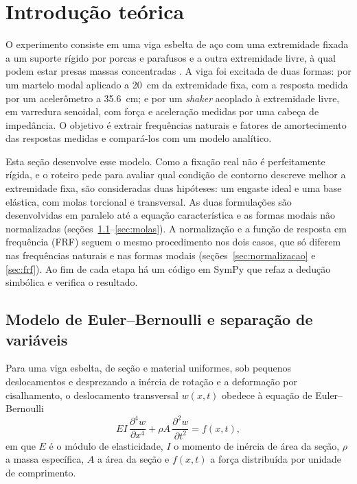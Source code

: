 \section{Introdução teórica}
\label{sec:intro}

O experimento consiste em uma viga esbelta de aço com uma extremidade fixada a um
suporte rígido por porcas e parafusos e a outra extremidade livre, à qual podem estar
presas massas concentradas \cite{roteiroLab1}. A viga foi excitada de duas formas:
por um martelo modal aplicado a \SI{20}{\centi\meter} da extremidade fixa, com a
resposta medida por um acelerômetro a \SI{35.6}{\centi\meter}; e por um
\emph{shaker} acoplado à extremidade livre, em varredura senoidal, com força e
aceleração medidas por uma cabeça de impedância. O objetivo é extrair frequências
naturais e fatores de amortecimento das respostas medidas e compará-los com um modelo
analítico.

Esta seção desenvolve esse modelo. Como a fixação real não é perfeitamente rígida, e o
roteiro pede para avaliar qual condição de contorno descreve melhor a extremidade
fixa, são consideradas duas hipóteses: um engaste ideal e uma base elástica, com molas
torcional e transversal. As duas formulações são desenvolvidas em paralelo até a
equação característica e as formas modais não normalizadas
(seções~\ref{sec:eb}--\ref{sec:molas}). A normalização e a função de resposta em
frequência (FRF) seguem o mesmo procedimento nos dois casos, que só diferem nas
frequências naturais e nas formas modais (seções~\ref{sec:normalizacao} e
\ref{sec:frf}). Ao fim de cada etapa há um código em SymPy que refaz a dedução
simbólica e verifica o resultado.

\subsection{Modelo de Euler--Bernoulli e separação de variáveis}
\label{sec:eb}

Para uma viga esbelta, de seção e material uniformes, sob pequenos deslocamentos e
desprezando a inércia de rotação e a deformação por cisalhamento, o deslocamento
transversal $w(x,t)$ obedece à equação de Euler--Bernoulli
\cite{rao2019,meirovitch2001}
\begin{equation}
    EI\,\frac{\partial^4 w}{\partial x^4} + \rho A\,\frac{\partial^2 w}{\partial t^2}
    = f(x,t),
    \label{eq:eb}
\end{equation}
em que $E$ é o módulo de elasticidade, $I$ o momento de inércia de área da seção,
$\rho$ a massa específica, $A$ a área da seção e $f(x,t)$ a força distribuída por
unidade de comprimento.

